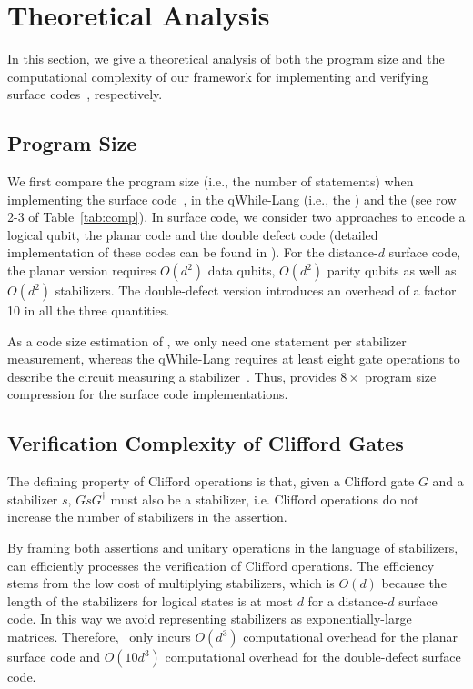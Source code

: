 \section{Theoretical Analysis}
In this section, we give a theoretical analysis of %
both the program size  and the computational complexity of our framework for implementing and verifying surface codes~\cite{Fowler2012SurfaceCT, Horsman2012SurfaceCQ}, respectively.


\subsection{Program Size}
We first compare the program size (i.e., the number of statements) when implementing the surface code~\cite{Fowler2012SurfaceCT, Horsman2012SurfaceCQ}, in the qWhile-Lang (i.e., the {\qwhilelang}) and the {\langname} (see row 2-3 of Table~\ref{tab:comp}).
In surface code, we consider two approaches to encode a logical qubit, the planar code and the double defect code (detailed implementation of these codes can be found in \cite{Fowler2012SurfaceCT, Horsman2012SurfaceCQ}).
For the distance-$d$ surface code, the planar version requires $O(d^2)$ data qubits, $O(d^2)$ parity qubits as well as $O(d^2)$ stabilizers. The double-defect version introduces an overhead of a factor 10 in all the three quantities.

As a code size estimation of {\langname}, we only need one statement per stabilizer measurement, whereas the qWhile-Lang requires at least eight gate operations
to describe the circuit measuring a stabilizer~\cite{Fowler2012SurfaceCT}. Thus, {\langname} provides $8\times$ program size compression for the surface code implementations.

\subsection{Verification Complexity of Clifford Gates} %

The defining property of Clifford operations is that, given a Clifford gate $G$ and a stabilizer $s$, $GsG^\dagger$ must also be a stabilizer, i.e. Clifford operations do not increase the number of stabilizers in the assertion. 

By framing both assertions and unitary operations in the language of stabilizers, {\myFrameworkName} can efficiently processes the verification of Clifford operations. The efficiency stems from the low cost of multiplying stabilizers, which is $O(d)$ because the length of the stabilizers for logical states is at most $d$ for a distance-$d$ surface code.
In this way we avoid representing stabilizers as exponentially-large matrices.
Therefore, \myFrameworkName~only incurs $O(d^3)$ computational overhead for the planar surface code and $O(10d^3)$ computational overhead for the double-defect surface code.

